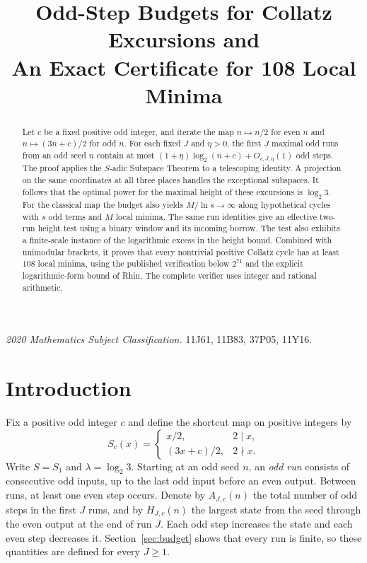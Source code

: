 \documentclass[11pt]{article}
\title{Odd-Step Budgets for Collatz Excursions and\\
An Exact Certificate for 108 Local Minima}
\author{}
\date{}
\theoremstyle{definition}
\begin{document}
\maketitle

\begin{abstract}
Let \(c\) be a fixed positive odd integer, and iterate the map
\(n\mapsto n/2\) for even \(n\) and \(n\mapsto(3n+c)/2\) for odd \(n\).
For each fixed \(J\) and \(\eta>0\), the first \(J\) maximal odd runs
from an odd seed \(n\) contain at most
\((1+\eta)\log_2(n+c)+O_{c,J,\eta}(1)\) odd steps. The proof applies
the \(S\)-adic Subspace Theorem to a telescoping identity. A projection
on the same coordinates at all three places handles the exceptional
subspaces. It follows that the optimal power for the maximal height
of these excursions is \(\log_2 3\). For the classical map the budget
also yields \(M/\ln s\to\infty\) along hypothetical cycles with \(s\)
odd terms and \(M\) local minima. The same run identities give an
effective two-run height test using a binary window and its incoming
borrow. The test also exhibits a finite-scale instance of the
logarithmic excess in the height bound. Combined with unimodular
brackets, it proves that every nontrivial positive Collatz cycle
has at least \(108\) local minima, using the published verification
below \(2^{71}\) and the explicit logarithmic-form bound of Rhin.
The complete verifier uses integer and rational arithmetic.
\end{abstract}

\noindent\textit{2020 Mathematics Subject Classification.}
11J61, 11B83, 37P05, 11Y16.

\section{Introduction}

Fix a positive odd integer \(c\) and define the shortcut map on positive
integers by
\[
 S_c(x)=
 \begin{cases}
 x/2,& 2\mid x,\\
 (3x+c)/2,& 2\nmid x .
 \end{cases}
\]
Write \(S=S_1\) and \(\lambda=\log_2 3\). Starting at an odd seed \(n\),
an \emph{odd run} consists of consecutive odd inputs, up to the last
odd input before an even output. Between runs, at least one even step
occurs. Denote by \(A_{J,c}(n)\) the total number of odd steps in the
first \(J\) runs, and by \(H_{J,c}(n)\) the largest state from the seed
through the even output at the end of run \(J\). Each odd step increases
the state and each even step decreases it. Section~\ref{sec:budget}
shows that every run is finite, so these quantities are defined for
every \(J\ge 1\).
\end{document}

